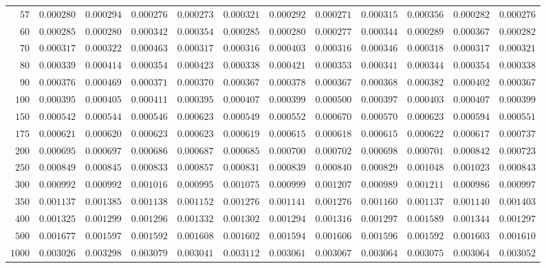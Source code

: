 \begin{sidewaystable}
\begin{tabular}{r|rrrrrrrrrrr}
$57$ & $0.000280$ & $0.000294$ & $0.000276$ & $0.000273$ & $0.000321$ & $0.000292$ & $0.000271$ & $0.000315$ & $0.000356$ & $0.000282$ & $0.000276$ \\
$60$ & $0.000285$ & $0.000280$ & $0.000342$ & $0.000354$ & $0.000285$ & $0.000280$ & $0.000277$ & $0.000344$ & $0.000289$ & $0.000367$ & $0.000282$ \\
$70$ & $0.000317$ & $0.000322$ & $0.000463$ & $0.000317$ & $0.000316$ & $0.000403$ & $0.000316$ & $0.000346$ & $0.000318$ & $0.000317$ & $0.000321$ \\
$80$ & $0.000339$ & $0.000414$ & $0.000354$ & $0.000423$ & $0.000338$ & $0.000421$ & $0.000353$ & $0.000341$ & $0.000344$ & $0.000354$ & $0.000338$ \\
$90$ & $0.000376$ & $0.000469$ & $0.000371$ & $0.000370$ & $0.000367$ & $0.000378$ & $0.000367$ & $0.000368$ & $0.000382$ & $0.000402$ & $0.000367$ \\
$100$ & $0.000395$ & $0.000405$ & $0.000411$ & $0.000395$ & $0.000407$ & $0.000399$ & $0.000500$ & $0.000397$ & $0.000403$ & $0.000407$ & $0.000399$ \\
$150$ & $0.000542$ & $0.000544$ & $0.000546$ & $0.000623$ & $0.000549$ & $0.000552$ & $0.000670$ & $0.000570$ & $0.000623$ & $0.000594$ & $0.000551$ \\
$175$ & $0.000621$ & $0.000620$ & $0.000623$ & $0.000623$ & $0.000619$ & $0.000615$ & $0.000618$ & $0.000615$ & $0.000622$ & $0.000617$ & $0.000737$ \\
$200$ & $0.000695$ & $0.000697$ & $0.000686$ & $0.000687$ & $0.000685$ & $0.000700$ & $0.000702$ & $0.000698$ & $0.000701$ & $0.000842$ & $0.000723$ \\
$250$ & $0.000849$ & $0.000845$ & $0.000833$ & $0.000857$ & $0.000831$ & $0.000839$ & $0.000840$ & $0.000829$ & $0.001048$ & $0.001023$ & $0.000843$ \\
$300$ & $0.000992$ & $0.000992$ & $0.001016$ & $0.000995$ & $0.001075$ & $0.000999$ & $0.001207$ & $0.000989$ & $0.001211$ & $0.000986$ & $0.000997$ \\
$350$ & $0.001137$ & $0.001385$ & $0.001138$ & $0.001152$ & $0.001276$ & $0.001141$ & $0.001276$ & $0.001160$ & $0.001137$ & $0.001140$ & $0.001403$ \\
$400$ & $0.001325$ & $0.001299$ & $0.001296$ & $0.001332$ & $0.001302$ & $0.001294$ & $0.001316$ & $0.001297$ & $0.001589$ & $0.001344$ & $0.001297$ \\
$500$ & $0.001677$ & $0.001597$ & $0.001592$ & $0.001608$ & $0.001602$ & $0.001594$ & $0.001606$ & $0.001596$ & $0.001592$ & $0.001603$ & $0.001610$ \\
$1000$ & $0.003026$ & $0.003298$ & $0.003079$ & $0.003041$ & $0.003112$ & $0.003061$ & $0.003067$ & $0.003064$ & $0.003075$ & $0.003064$ & $0.003052$ \\
\hline
\end{tabular}
\end{sidewaystable}
 

